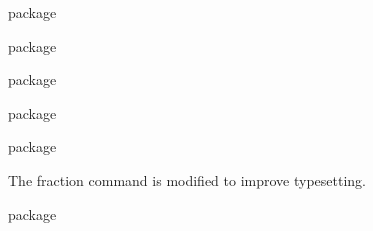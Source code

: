 \documentclass[commonsets,load]{skdoc}
\begin{document}
  \begin{macro}{\argmin}
\begin{MacroCode}{package}
\NewDocumentCommand{}
\end{MacroCode}
  \end{macro}
  \begin{macro}{\max}
\begin{MacroCode}{package}
\RenewDocumentCommand{}
\end{MacroCode}
  \end{macro}
  \begin{macro}{\argmax}
\begin{MacroCode}{package}
\NewDocumentCommand{}
\end{MacroCode}
  \end{macro}
  \begin{macro}{\sup}
\begin{MacroCode}{package}
\RenewDocumentCommand{}
\end{MacroCode}
  \end{macro}
  \begin{macro}{\inf}
\begin{MacroCode}{package}
\RenewDocumentCommand{}
\end{MacroCode}
  \end{macro}

  The fraction command is modified to improve typesetting.
  \begin{macro}{\frac}
\begin{MacroCode}{package}
\RenewDocumentCommand{}
\end{MacroCode}
  \end{macro}
 
\end{document}
